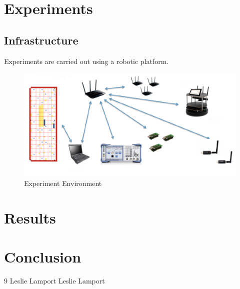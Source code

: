 \documentclass[11pt,a4paper,headinclude,footinclude,chapterprefix=on]{scrreprt}
\begin{document}
\chapter{Experiments} 
\section{Infrastructure} 
Experiments are carried out using a robotic platform.
\begin{figure}
	[!] \centering 
	\includegraphics[width=15cm]{Images/evari.png} \caption{Experiment Environment} \label{fig:experiment} 
\end{figure}
\chapter{Results}

\chapter{Conclusion}

\pagebreak 

\begin{thebibliography}
	{9}  Leslie Lamport  Leslie Lamport 
\end{thebibliography}
\end{document}
